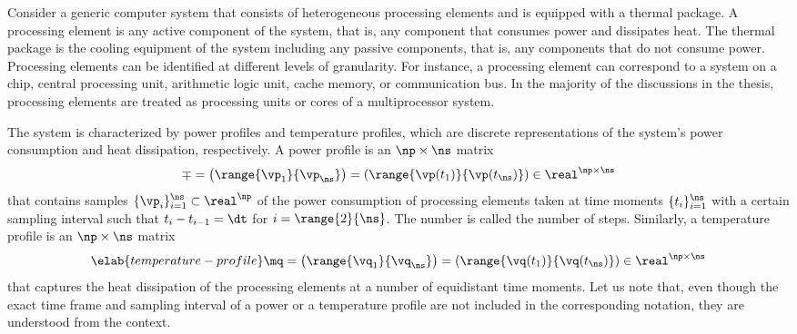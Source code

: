 Consider a generic computer system that consists of \np heterogeneous processing
elements and is equipped with a thermal package. A processing element is any
active component of the system, that is, any component that consumes power and
dissipates heat. The thermal package is the cooling equipment of the system
including any passive components, that is, any components that do not consume
power. Processing elements can be identified at different levels of granularity.
For instance, a processing element can correspond to a system on a chip, central
processing unit, arithmetic logic unit, cache memory, or communication bus. In
the majority of the discussions in the thesis, processing elements are treated
as processing units or cores of a multiprocessor system.

The system is characterized by power profiles and temperature profiles, which
are discrete representations of the system's power consumption and heat
dissipation, respectively. A power profile is an $\np \times \ns$ matrix
\[
  \mp
  = \left(\range{\vp_1}{\vp_\ns}\right)
  = \left(\range{\vp(t_1)}{\vp(t_\ns)}\right) \in \real^{\np \times \ns}
\]
that contains \ns samples $\{ \vp_i \}_{i = 1}^\ns \subset \real^\np$ of the
power consumption of \np processing elements taken at \ns time moments $\{ t_i
\}_{i = 1}^\ns$ with a certain sampling interval \dt such that $t_i - t_{i - 1}
= \dt$ for $i = \range{2}{\ns}$. The number \ns is called the number of steps.
Similarly, a temperature profile is an $\np \times \ns$ matrix
\begin{equation} \elab{temperature-profile}
  \mq
  = \left(\range{\vq_1}{\vq_\ns}\right)
  = \left(\range{\vq(t_1)}{\vq(t_\ns)}\right) \in \real^{\np \times \ns}
\end{equation}
that captures the heat dissipation of the processing elements at a number of
equidistant time moments. Let us note that, even though the exact time frame and
sampling interval of a power or a temperature profile are not included in the
corresponding notation, they are understood from the context.
